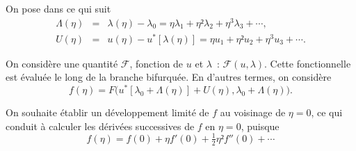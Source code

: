 \documentclass[12pt, final]{amsart}
\begin{document}
On pose dans ce qui suit
\begin{eqnarray}
  \label{eq20211112155446}
  \Lambda (\eta )&=&\lambda (\eta )-\lambda _0=\eta \lambda _1+\eta ²\lambda _2+\eta ^3\lambda _3+\cdots,\\
  \label{eq20211112113028}
  U(\eta )&=&u(\eta )-u^*[\lambda (\eta )]=\eta u_1+\eta ²u_2+\eta ^3u_3+\cdots.
\end{eqnarray}

On considère une quantité \(\mathcal{F}\), fonction de \(u\) et \(\lambda \)~: \(\mathcal{F}(u,
\lambda )\). Cette fonctionnelle est évaluée le long de la branche bifurquée. En
d'autres termes, on considère
\begin{equation}
  f(\eta )=F\bigl(u^*[\lambda _0+\Lambda (\eta )]+U(\eta ), \lambda _0+\Lambda (\eta )\bigr).
\end{equation}

On souhaite établir un développement limité de \(f\) au voisinage de \(\eta =0\),
ce qui conduit à calculer les dérivées successives de \(f\) en \(\eta =0\), puisque
\begin{equation}
  f(\eta )=f(0)+\eta  f'(0)+\tfrac12\eta ²f''(0)+\cdots
\end{equation}
\end{document}
